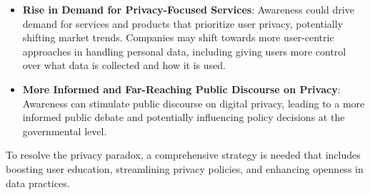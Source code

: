 \begin{itemize}[nosep]
\item \textbf{Rise in Demand for Privacy-Focused Services}: Awareness could drive demand for services and products that prioritize user privacy, potentially shifting market trends.
Companies may shift towards more user-centric approaches in handling personal data, including giving users more control over what data is collected and how it is used.

\item \textbf{More Informed and Far-Reaching Public Discourse on Privacy}: Awareness can stimulate public discourse on digital privacy, leading to a more informed public debate and potentially influencing policy decisions at the governmental level.

\end{itemize}












To resolve the privacy paradox, a comprehensive strategy is needed that includes boosting user education, streamlining privacy policies, and enhancing openness in data practices.






